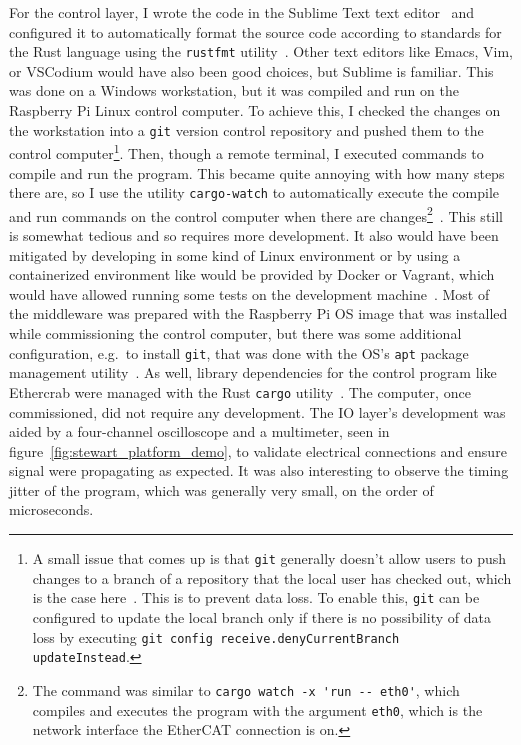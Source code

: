 \documentclass[english,12pt,a4paper,pdftex,eng,utf8]{aaltothesis}
\begin{document}
For the control layer, I wrote the code in the Sublime Text text editor~\cite{SublimeText} and configured it to automatically format the source code according to standards for the Rust language using the \verb|rustfmt| utility~\cite{rustfmt}.  Other text editors like Emacs, Vim, or VSCodium would have also been good choices, but Sublime is familiar.  This was done on a Windows workstation, but it was compiled and run on the Raspberry Pi Linux control computer.  To achieve this, I checked the changes on the workstation into a \verb|git| version control repository and pushed them to the control computer\footnote{A small issue that comes up is that \verb|git| generally doesn't allow users to push changes to a branch of a repository that the local user has checked out, which is the case here~\cite[§receive.denyCurrentBranch]{GitConfig}.  This is to prevent data loss.  To enable this, \verb|git| can be configured to update the local branch only if there is no possibility of data loss by executing \verb|git config receive.denyCurrentBranch updateInstead|.}.  Then, though a remote terminal, I executed commands to compile and run the program.  This became quite annoying with how many steps there are, so I use the utility \verb|cargo-watch| to automatically execute the compile and run commands on the control computer when there are changes\footnote{The command was similar to \verb|cargo watch -x 'run -- eth0'|, which compiles and executes the program with the argument \verb|eth0|, which is the network interface the EtherCAT connection is on.}~\cite{CargoWatch}.  This still is somewhat tedious and so requires more development.  It also would have been mitigated by developing in some kind of Linux environment or by using a containerized environment like would be provided by Docker or Vagrant, which would have allowed running some tests on the development machine~\cite{DockerDev,VagrantDev}.  Most of the middleware was prepared with the Raspberry Pi OS image that was installed while commissioning the control computer, but there was some additional configuration, e.g.\ to install \verb|git|, that was done with the OS's \verb|apt| package management utility~\cite{apt}.  As well, library dependencies for the control program like Ethercrab were managed with the Rust \verb|cargo| utility~\cite{Cargo}.  The computer, once commissioned, did not require any development.  The IO layer's development was aided by a four-channel oscilloscope and a multimeter, seen in figure~\ref{fig:stewart_platform_demo}, to validate electrical connections and ensure signal were propagating as expected.  It was also interesting to observe the timing jitter of the program, which was generally very small, on the order of microseconds.
\end{document}
